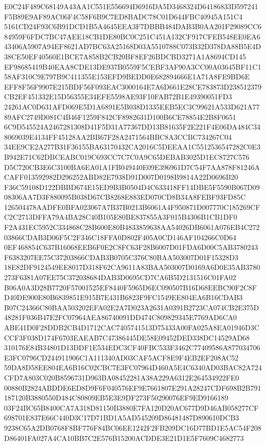 \documentclass[UTF8,fontset=fandol,zihao=-4,a4paper]{ctexart}
\begin{document}
{{E0C24F489C68149A43AA1C551E556694D6916DA5D3468324D64186833D597241F5B89E9AF89AC06F4C58F6B9C7ED8BADC78C01D644FBC40945A151C4
5161CD24F93C6B91DCD1B5A4645EEA3F7DBBB484DAB3B0AA201F29089CC684959F6FDC7BC47AEE18CB1DE80BC0C251C451A132CF917CFEB548EE0EA6
43406A5907A94EF8621AD7BC63A25168D03A5510788C073B32D378DA88B5E4D38CE50EF40560E1BCE7A858B2CB20BF8EF26BDCBD3271A1A8694CD145
EF98685419B40EAA8CDE13DE937B0559F5CEBF3AF90A3CC00A03645BF11C158AF310C9E797B9C411355E153EFD9BEDD0E682894666E1A71A8FE9BD6E
EFF8F56F9907E215BDF56F093EAC3000164E7A6D661E28CE783873D238512379CB2EF451332E15D56355E34EFE5598AE93F10FAB72B1E49390051FD3
24261AC0D631AFD069E5D1A6891E5B038D1335EEB5EC3C99621A533D621A7789AFC2749D081C4B46F1259F842CF8982631D100B6CE78854E2B8F0651
6C9D545524A2467281308D41F5D31A77367DD13B81635F2E221F4E06DA484C348069039E4134FF45128AA2BB67F28A2471564BBC8A3CCBC734267C04
34EE9CE2A277B31F36155BA63170432CA2016C5DEEAA1C5512536547282C0E3B942E71C62DBCEABC019C693CC7C7C0A9C65DEBAB3025D1EC8727C576
D5C720CB3E6C3100BA6EA01A1FB049440E09E396961D7C54F7AA878F81246ACAFF013592982D296252ABD82E7938D91D007D0198B9814A22D0696B20
F36C59108D122DBBD674E15ED9B3B0504D4C633418FF14DBE5F5590B067D0908306AA7D3F880095B038D67CB8268E883ED070CD8B34A8FEBF93FD85C
126504478AADFE0BFA023067A7B37B0213B6061A4F950871D007770C185269CFC2C2713DFFA79A4BA28C40B105E80BE837855A3F015B4306B1CB1DF0
F2A431EC5952C334868C28B600E80B4833859638AA54026DB6061A076EB4C27203866CDAB3D06F5C2F346C18FFA0D802F405A0CD146AF104266C0D64
0EF468854C637B16068EEB6F0E2C8FC63F28B6007D01FDA6D00C5AB3780243F6383207EE75C37203866CDAB3B0705C376C80BAA503007D01F15328D3
18E82DF9124549EE8017D318F62CA9611A83BAA503007D0169A6D0E35AB3780273F6381A07EE75C372038684DAB3D0695CD7CA6B5D2131516C01FA02
B06A0A3D28B7720F57001525EF8440F5965D6EC090507B16D68EEBC90F2C8FD40DE900E80B6839851E915B7E431B6823F9FC1549EE804EA6B16CDAB3
B07C24366C80BAA503202EFA02E2A7D023A2631A0391B2723CA074CB2E375D48281F036B47E2FC07964AEA86740091DD474C809829345E7769AD6CA0
ABE41D0F28DDB2CB4D1712CAC7405741513D75433A00FA025A8EA01946D3CCCF3F038D174F6703EAEAB7C47386445DE58E09452DED338DC14529AD68
310176E84B34801D13DDF1E534EDC3CF40FBC533F3462C77409586A877034706E3FC0796CD244911906C1A111340AD03CAF5ACF8E9F4EB2EF208AC52
59DA8D58EE804EA6B16C02CBC7E3FC07964D460A5E4C6340AD03BAC82A724CFD7A803C020B8596731D963BA08452281A38A229A6312E264534922FE0
00880B2824ABDDE6ED8D9F6F040576EF9E7661807E291A28247CDF698B2B791187120B3880550D484C80809EB5E3E9DF273F50290076EF9ED9166189
03F24BC65B8400CA7A318D81150B3880E7FA120D20AC677D9D46AB058277CF698701E837E66C440D3C17D71BD1A5AD545209D86481487D890610DCB3
9238C65A2DB0768F8BF776F84BC06EE1242F2FB209DC16D77BD1E5AC54F208D86401FA027A4CA10BB7C2E576B15200ACDDE3E21D1E5F7609C4682773
}}
\end{document}
